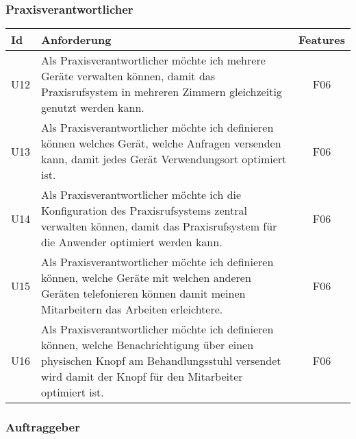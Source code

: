 \clearpage

\subsubsection*{Praxisverantwortlicher}

\begin{table}[h]
    \centering
    \begin{tabular}{|l|p{13cm}|c|}
        \hline
        \textbf{Id} & \textbf{Anforderung}                                                                                                                                                                               & \textbf{Features} \\
        \hline
        U12         & Als Praxisverantwortlicher möchte ich mehrere Geräte verwalten können, damit das Praxisrufsystem in mehreren Zimmern gleichzeitig genutzt werden kann. & F06 \\
        \hline
        U13         & Als Praxisverantwortlicher möchte ich definieren können welches Gerät, welche Anfragen versenden kann, damit jedes Gerät Verwendungsort optimiert ist. & F06 \\
        \hline
        U14         & Als Praxisverantwortlicher möchte ich die Konfiguration des Praxisrufsystems zentral verwalten können, damit das Praxisrufsystem für die Anwender optimiert werden kann. & F06 \\
        \hline
        U15         & Als Praxisverantwortlicher möchte ich definieren können, welche Geräte mit welchen anderen Geräten telefonieren können damit meinen Mitarbeitern das Arbeiten erleichtere. & F06 \\
        \hline
        U16         & Als Praxisverantwortlicher möchte ich definieren können, welche Benachrichtigung über einen physischen Knopf am Behandlungsstuhl versendet wird damit der Knopf für den Mitarbeiter optimiert ist. & F06 \\
        \hline
    \end{tabular}\label{tab:userstories2}
\end{table}

\subsubsection*{Auftraggeber}\label{subsec:auftraggeber}

